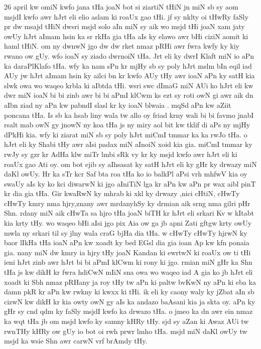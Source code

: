\documentclass[a4paper]{article}
\begin{document}
26 april kw omiN kwfo jana tHa joaN bot si ziartiN tHiN jn miN sb sy aom msjdI kwfo awr hJrt eli elio aslam ki roaUx gao  tHi.
jf sy nklty oi tHwRy faSly pr dw msajd tHiN dwsri  msjd solo aIn miN sy aik wo msjd tHi joaN xam jaty owUy hJrt aImam hsin ka sr rkHa gia tHa aIs ky elawo awr bHi ciziN aomit ki haml tHiN.
om ny dwnwN jgo dw  dw rket nmaz pRHi awr fwra kwfy ky kiy rwano ow gUy.
wfo ioaN sy ziado dwrnoiN tHa.
Jrt eli ky dwrI Klaft miN io aPn ka daraPlKlafo tHa.
wfy ka nam sPn kr mjHy sb sy poly hJrt mslm bIn eqil iad AUy jw hJrt aImam hsin ky ailci bn kr kwfo AUy tHy awr ioaN aPn ky satH kia slwk owa wo waqeo krbla ki aIbtda tHi.
wsri swc dImaG miN AUi ko hJrt eli kw dwr miN ioaN bi bi zinb awr bi bi aPmI klCwm ks ezt sy roti owN gi awr aik dn aIbn ziad ny aPn kw pabndI slasl kr ky ioaN blwaia .
mqSd aPn kw aZiit poncana  tHa.
Is sb ka hsab liny wala tw allo oy friad krny wali bi bi favmo jnabI rsalt  mab owN gy jnowN ny koa tHa js ny miry aol bit kw tklif di aPs ny mjHy dPkHi kia.
wfy ki ziarat miN sb sy poly hJrt miCmI tmmar ka ka rwJo tHa.
o hJrt eli ky Shabi tHy awr aIsi padax miN aInoiN xoid kia gia.
miCmI tmmar  ky rwJy sy gzr kr AdHa klw miTr lmbi sRk vy kr ky msjd kwfo  awr hJrt eli ki roaUx gao Ati oy.
om bot ejib sy aIhsasat ky satH hJrt eli ky gHr ky drwazy miN daKl owUy.
Hr ka sTr kcr Saf bta roa tHa ko io balkPl aPsi vrh mhfwV kia oy swaUy aIs ky ko kci diwarwN ki jgo aIniTiN lga kr aPn kw aPn pr wax aibl pinT kr dia gia tHa.
Gir kwaRwN ky mhrab ki xkl ky drwazy ,nici cHtiN, cHwTy cHwTy kmry nma hjry,znany awr mrdanyhSy ky drmian aik srng nma gilri pHr Shn.
rdany miN aik cHwTa sa hjro tHa joaN biTH kr hJrt eli srkari Kv w kItabt kia krty tHy.
wo waqeo bHi aIsi jgo pix Aia ow ga jb apni Zati gftgw krty owUy mwla ny srkari til sy jlny wala craG bjHa dia tHa.
w cHwTy cHwTy hjrwN ky baor lIkHa tHa ioaN aPn kw xoadt ky  bed EGsl dia gia ioan Ap kw kfn ponaia gia.
nany miN dw kmry ia hjry tHy joaN Kandan ki ewrtwN ki roaUx ow ti tHi ieni hJrt zinb awr hJrt bi bi aPmI klCwm ki rony ki jgo.
rmian  miN gHr ka Shn tHa js kw dikH kr  fwra hdiCwN mIiN sna owa  wo waqeo iad A gia ko jb hJrt eli xoadt ki Sbh nmaz  pRHany ja roy tHy tw aPn ki paltw bvKwN ny aPn ki eba ka damn pkR kr aPn kw rwkny ki kwxx ki tHi.
ik eli ky caony waly ky jZbat aIn sb cizwN kw dikH kr kia  owty owN gy aIs ka andazo baAsani kia ja skta oy.
aPn ky gHr  sy cnd qdm ky faSly  msjdI kwfo ka drwazo  tHa.
o jmeo ka dn awr ein nmaz ka wqt tHa jb om  msjd kwfo ky samny kHRy tHy.
sjd sy aZan ki Awaz AUi tw rwnTHy kHRy ow gUy io bot oi rwh prwr  lmho tHa.
msjd miN daKl owUy tw msjd ka wsie Shn awr carwN vrf brAmdy tHy.
\end{document}

